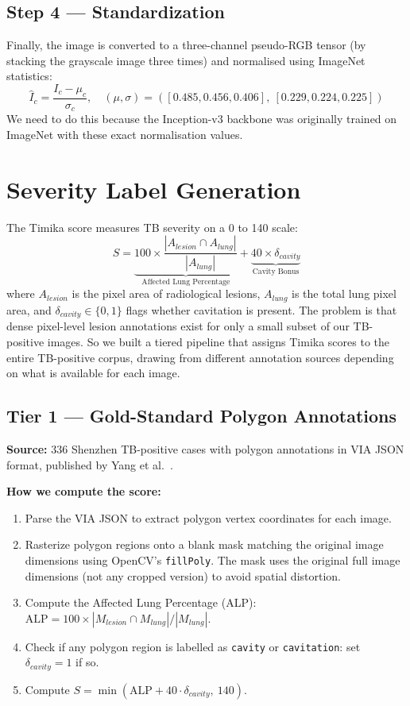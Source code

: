 \documentclass[12pt]{report}
\begin{document}
\subsection{Step 4 --- Standardization}
Finally, the image is converted to a three-channel pseudo-RGB tensor (by stacking the grayscale image three times) and normalised using ImageNet statistics:
\begin{equation}
\hat{I}_c = \frac{I_c - \mu_c}{\sigma_c}, \quad (\mu, \sigma) = ([0.485, 0.456, 0.406],\ [0.229, 0.224, 0.225])
\end{equation}
We need to do this because the Inception-v3 backbone was originally trained on ImageNet with these exact normalisation values.

\section{Severity Label Generation}

The Timika score measures TB severity on a 0 to 140 scale:
\begin{equation}
S = \underbrace{100 \times \frac{|A_{lesion} \cap A_{lung}|}{|A_{lung}|}}_{\text{Affected Lung Percentage}} + \underbrace{40 \times \delta_{cavity}}_{\text{Cavity Bonus}}
\end{equation}
where $A_{lesion}$ is the pixel area of radiological lesions, $A_{lung}$ is the total lung pixel area, and $\delta_{cavity} \in \{0,1\}$ flags whether cavitation is present. The problem is that dense pixel-level lesion annotations exist for only a small subset of our TB-positive images. So we built a tiered pipeline that assigns Timika scores to the entire TB-positive corpus, drawing from different annotation sources depending on what is available for each image.

\subsection{Tier 1 --- Gold-Standard Polygon Annotations}
\textbf{Source:} 336 Shenzhen TB-positive cases with polygon annotations in VIA JSON format, published by Yang et al.~\cite{ref5}.

\textbf{How we compute the score:}
\begin{enumerate}
    \item Parse the VIA JSON to extract polygon vertex coordinates for each image.
    \item Rasterize polygon regions onto a blank mask matching the original image dimensions using OpenCV's \texttt{fillPoly}. The mask uses the original full image dimensions (not any cropped version) to avoid spatial distortion.
    \item Compute the Affected Lung Percentage (ALP): $\text{ALP} = 100 \times |M_{lesion} \cap M_{lung}| / |M_{lung}|$.
    \item Check if any polygon region is labelled as \texttt{cavity} or \texttt{cavitation}: set $\delta_{cavity} = 1$ if so.
    \item Compute $S = \min(\text{ALP} + 40 \cdot \delta_{cavity},\ 140)$.
\end{enumerate}
\end{document}
